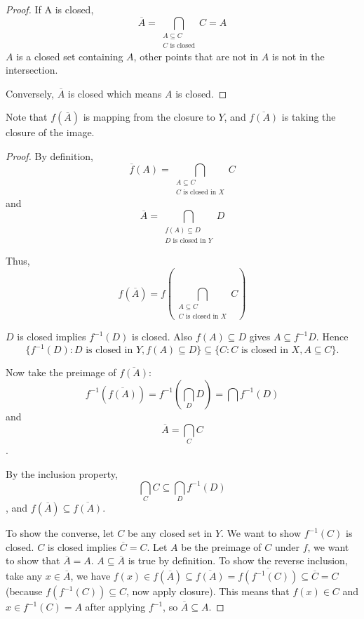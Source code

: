 \documentclass[article,11pt, reqno]{article}
\newtheorem*{lemma}{Lemma}
\theoremstyle{remark}
\newcommand{\<}{\langle}
\renewcommand{\>}{\rangle}
\begin{document}
\begin{proof}
    If A is closed,
    $$\overline A = \bigcap_{\substack{A\subseteq C\\ C \text{  is closed}}} C = A$$ $A$ is a closed set containing $A$, other points that are not in $A$ is not in the intersection.

    Conversely, $\overline A$ is closed which means $A$ is closed.
\end{proof}
\noindent
{}
Note that $f(\overline A)$ is mapping from the closure to $Y$, and $\overline{f(A)}$ is taking the closure of the image.
\begin{proof}
    By definition,
    $$\overline f(A) = \bigcap_{\substack{A\subseteq C\\ C \text{  is closed in } X}} C$$
    and $$\overline A = \bigcap_{\substack{f(A)\subseteq D\\ D \text{  is closed in } Y}} D$$

    Thus, $$f(\overline A) = f(\bigcap_{\substack{A\subseteq C\\ C \text{  is closed in } X}} C)$$

    $D$ is closed implies $f^{-1}(D)$ is closed. Also $f(A)\subseteq D$ gives $A\subseteq f^{-1} D$. Hence
    $$\{f^{-1}(D): D\text{ is closed in }Y, f(A)\subseteq D\}\subseteq \{C: C\text{ is closed in }X, A\subseteq C\}.$$

    Now take the preimage of $\overline{f(A)}$:
    $$f^{-1}(\overline{f(A)}) = f^{-1}(\bigcap_D D) = \bigcap f^{-1}(D)$$
    and 
    $$\overline A = \bigcap_C C$$.

    By the inclusion property, $$\bigcap_C C\subseteq \bigcap_D f^{-1}(D)$$, and $f(\overline A)\subseteq \overline{f(A)}$.

    To show the converse, let $C$ be any closed set in $Y$. We want to show $f^{-1}(C)$ is closed. $C$ is closed implies $\overline C = C$. Let $A$ be the preimage of $C$ under $f$, we want to show that $\overline A=A$. $A\subseteq \overline A$ is true by definition. To show the reverse inclusion, take any $x\in\overline A$, we have 
    $f(x)\in f(\overline A)\subseteq \overline{f(A)}=\overline{f(f^{-1}(C))}\subseteq\overline C = C$ (because $f(f^{-1}(C))\subseteq C$, now apply closure). This means that $f(x)\in C$ and $x\in f^{-1}(C) = A$ after applying $f^{-1}$, so $\overline A\subseteq A$.
\end{proof}
\end{document}
